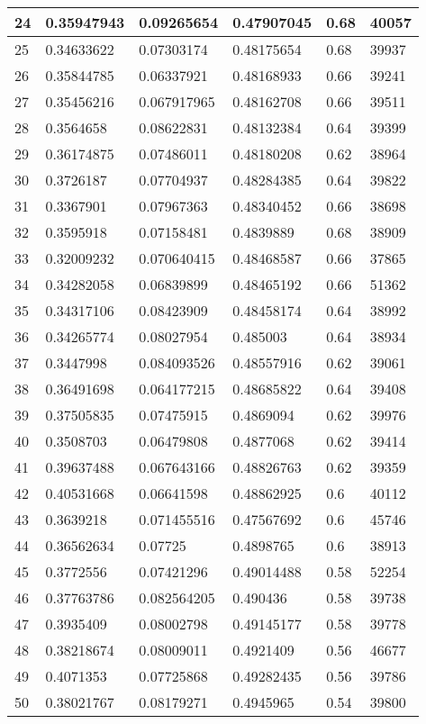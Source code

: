 \begin{longtable}{|l|l|l|l|l|l|}
24 & 0.35947943 & 0.09265654 & 0.47907045 & 0.68 & 40057 \\ \hline 
25 & 0.34633622 & 0.07303174 & 0.48175654 & 0.68 & 39937 \\ \hline 
26 & 0.35844785 & 0.06337921 & 0.48168933 & 0.66 & 39241 \\ \hline 
27 & 0.35456216 & 0.067917965 & 0.48162708 & 0.66 & 39511 \\ \hline 
28 & 0.3564658 & 0.08622831 & 0.48132384 & 0.64 & 39399 \\ \hline 
29 & 0.36174875 & 0.07486011 & 0.48180208 & 0.62 & 38964 \\ \hline 
30 & 0.3726187 & 0.07704937 & 0.48284385 & 0.64 & 39822 \\ \hline 
31 & 0.3367901 & 0.07967363 & 0.48340452 & 0.66 & 38698 \\ \hline 
32 & 0.3595918 & 0.07158481 & 0.4839889 & 0.68 & 38909 \\ \hline 
33 & 0.32009232 & 0.070640415 & 0.48468587 & 0.66 & 37865 \\ \hline 
34 & 0.34282058 & 0.06839899 & 0.48465192 & 0.66 & 51362 \\ \hline 
35 & 0.34317106 & 0.08423909 & 0.48458174 & 0.64 & 38992 \\ \hline 
36 & 0.34265774 & 0.08027954 & 0.485003 & 0.64 & 38934 \\ \hline 
37 & 0.3447998 & 0.084093526 & 0.48557916 & 0.62 & 39061 \\ \hline 
38 & 0.36491698 & 0.064177215 & 0.48685822 & 0.64 & 39408 \\ \hline 
39 & 0.37505835 & 0.07475915 & 0.4869094 & 0.62 & 39976 \\ \hline 
40 & 0.3508703 & 0.06479808 & 0.4877068 & 0.62 & 39414 \\ \hline 
41 & 0.39637488 & 0.067643166 & 0.48826763 & 0.62 & 39359 \\ \hline 
42 & 0.40531668 & 0.06641598 & 0.48862925 & 0.6 & 40112 \\ \hline 
43 & 0.3639218 & 0.071455516 & 0.47567692 & 0.6 & 45746 \\ \hline 
44 & 0.36562634 & 0.07725 & 0.4898765 & 0.6 & 38913 \\ \hline 
45 & 0.3772556 & 0.07421296 & 0.49014488 & 0.58 & 52254 \\ \hline 
46 & 0.37763786 & 0.082564205 & 0.490436 & 0.58 & 39738 \\ \hline 
47 & 0.3935409 & 0.08002798 & 0.49145177 & 0.58 & 39778 \\ \hline 
48 & 0.38218674 & 0.08009011 & 0.4921409 & 0.56 & 46677 \\ \hline 
49 & 0.4071353 & 0.07725868 & 0.49282435 & 0.56 & 39786 \\ \hline 
50 & 0.38021767 & 0.08179271 & 0.4945965 & 0.54 & 39800 \\ \hline 
\end{longtable}